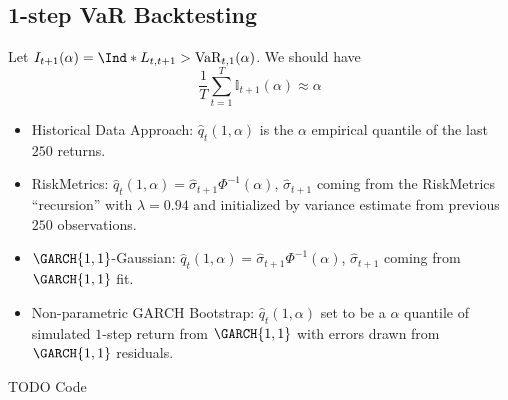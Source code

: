 \subsection*{1-step VaR Backtesting}
Let $ \mathbb{I}_{t+1}(\alpha)=\Ind*{L_{t,t+1}>\text{VaR}_{t,1}(\alpha)} $. We should
have
\[ \frac{1}{T} \sum_{t=1}^{T} \mathbb{I}_{t+1}(\alpha)\approx \alpha \]
\begin{itemize}
    \item Historical Data Approach: $ \hat{q}_t(1,\alpha) $ is the $ \alpha $
          empirical quantile of the last $ 250 $ returns.
    \item RiskMetrics: $ \hat{q}_t(1,\alpha)=\hat{\sigma}_{t+1}\Phi^{-1}(\alpha) $,
          $ \hat{\sigma}_{t+1} $ coming from the RiskMetrics ``recursion'' with $ \lambda=0.94 $
          and initialized by variance estimate from previous $ 250 $ observations.
    \item $ \GARCH{1,1} $-Gaussian: $ \hat{q}_{t}(1,\alpha)=\hat{\sigma}_{t+1}\Phi^{-1}(\alpha) $,
          $ \hat{\sigma}_{t+1} $ coming from $ \GARCH{1,1} $ fit.
    \item Non-parametric GARCH Bootstrap: $ \hat{q}_{t}(1,\alpha) $ set to be a
          $ \alpha $ quantile of simulated $ 1 $-step return from $ \GARCH{1,1} $
          with errors drawn from $ \GARCH{1,1} $ residuals.
\end{itemize}
TODO Code
